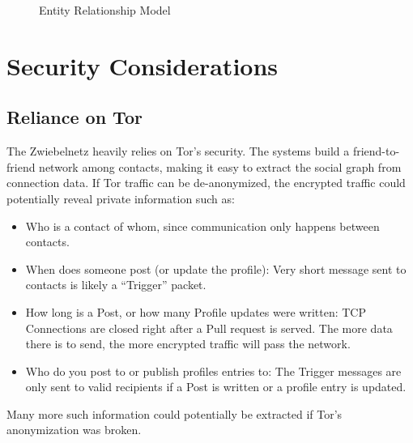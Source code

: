 \documentclass[12pt]{article}
\begin{document}
\begin{landscape}
\begin{figure}[h]
    \caption{Entity Relationship Model}
  \end{figure}
\end{landscape}




\section{Security Considerations}

\subsection{Reliance on Tor}
\label{tor_security}
The Zwiebelnetz heavily relies on Tor's security. The systems build a friend-to-friend network among contacts, making it easy to extract the social graph from connection data. If Tor traffic can be de-anonymized, the encrypted traffic could potentially reveal private information such as:
\begin{itemize}
  \item Who is a contact of whom, since communication only happens between contacts.
  \item When does someone post (or update the profile): Very short message sent to contacts is likely a ``Trigger'' packet.
  \item How long is a Post, or how many Profile updates were written: TCP Connections are closed right after a Pull request is served. The more data there is to send, the more encrypted traffic will pass the network.
  \item Who do you post to or publish profiles entries to: The Trigger messages are only sent to valid recipients if a Post is written or a profile entry is updated.
\end{itemize}
Many more such information could potentially be extracted if Tor's anonymization was broken.
\end{document}
